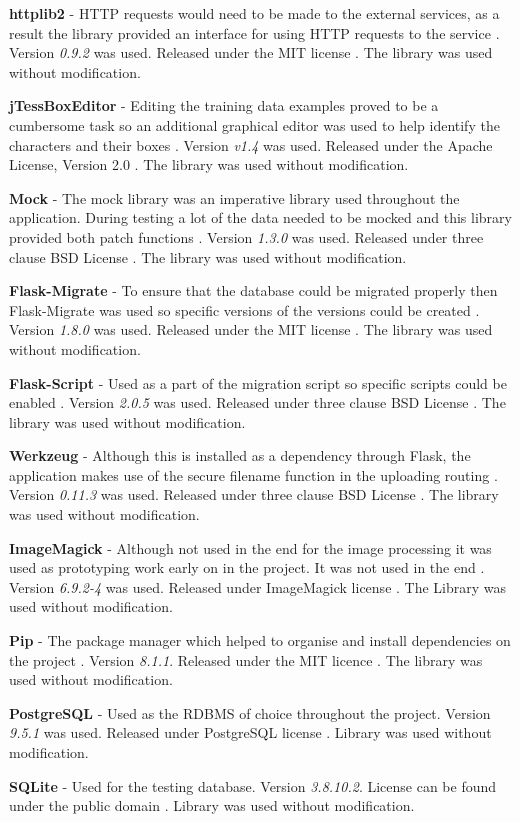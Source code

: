\textbf{httplib2} - HTTP requests would need to be made to the external services, as a result the library provided an interface for using HTTP requests to the service \cite{citeulike:14025936}. Version \textit{0.9.2} was used.  Released under the MIT license \cite{citeulike:14025880}. The library was used without modification.

\textbf{jTessBoxEditor} - Editing the training data examples proved to be a cumbersome task so an additional graphical editor was used to help identify the characters and their boxes \cite{citeulike:13926798}. Version \textit{v1.4} was used.  Released under the Apache License, Version 2.0 \cite{apache_license}. The library was used without modification.

\textbf{Mock} - The mock library was an imperative library used throughout the application. During testing a lot of the data needed to be mocked and this library provided both patch functions \cite{citeulike:14020599}. Version \textit{1.3.0} was used. Released under three clause BSD License \cite{citeulike:14025861}. The library was used without modification.

\textbf{Flask-Migrate} - To ensure that the database could be migrated properly then Flask-Migrate was used so specific versions of the versions could be created \cite{citeulike:14025941}. Version \textit{1.8.0} was used.  Released under the MIT license \cite{citeulike:14025880}. The library was used without modification.

\textbf{Flask-Script} - Used as a part of the migration script so specific scripts could be enabled \cite{citeulike:14025943}. Version \textit{2.0.5} was used. Released under three clause BSD License \cite{citeulike:14025861}. The library was used without modification.

\textbf{Werkzeug} - Although this is installed as a dependency through Flask, the application makes use of the secure filename function in the uploading routing \cite{citeulike:14025945}. Version \textit{0.11.3} was used. Released under three clause BSD License \cite{citeulike:14025861}. The library was used without modification.

\textbf{ImageMagick} - Although not used in the end for the image processing it was used as prototyping work early on in the project. It was not used in the end \cite{citeulike:14023816}. Version \textit{6.9.2-4} was used. Released under ImageMagick license \cite{citeulike:14027133}. The Library was used without modification.

\textbf{Pip} - The package manager which helped to organise and install dependencies on the project \cite{citeulike:14025946}. Version \textit{8.1.1}. Released under the MIT licence \cite{citeulike:14025880}. The library was used without modification.

\textbf{PostgreSQL} - Used as the RDBMS of choice throughout the project. Version \textit{9.5.1} was used. Released under PostgreSQL license \cite{citeulike:14027320}. Library was used without modification.

\textbf{SQLite} - Used for the testing database. Version \textit{3.8.10.2}. License can be found under the public domain \cite{citeulike:14027312}. Library was used without modification.

